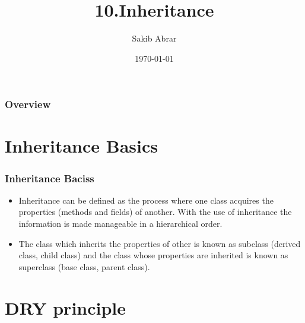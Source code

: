 \documentclass{beamer}
\title[Inheritance]{10.Inheritance} %
\author{Sakib Abrar} %
\institute[BUET] %
{
CSE\\~\\Bangladesh University of Engineering \& Technology \\ %
\medskip
\textit{sakib.cghs@gmail.com} %
}
\date{\today} %
\begin{document}
\begin{frame}
\titlepage %
\end{frame}

\begin{frame}
\frametitle{Overview} %
\tableofcontents %
\end{frame}


\section{Inheritance Basics}

\begin{frame}
\frametitle{Inheritance Baciss}
\begin{itemize}
\item Inheritance can be defined as the process where one class acquires the properties (methods and fields) of another. With the use of inheritance the information is made manageable in a hierarchical order.
\item The class which inherits the properties of other is known as subclass (derived class, child class) and the class whose properties are inherited is known as superclass (base class, parent class).
\end{itemize}
\end{frame}



\section{DRY principle}
\end{document}
